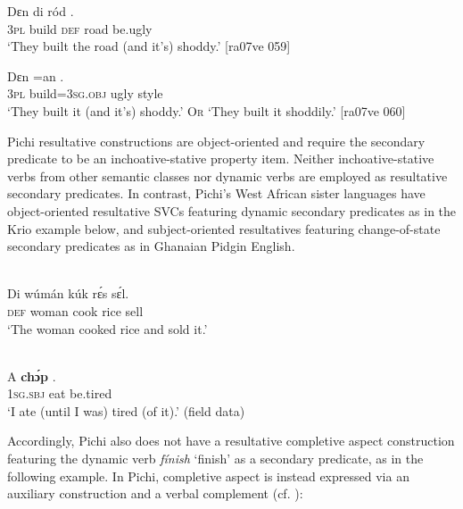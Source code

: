 \ea%
    \label{ex:key:1604}
    \gll Dɛn     di  ród    .\\
\textsc{3pl}  build  \textsc{def}  road    be.ugly\\

\glt ‘They built the road (and it’s) shoddy.’ [ra07ve 059]
\z


\ea%
    \label{ex:key:1605}
    \gll Dɛn  =an      .\\
\textsc{3pl}  build=\textsc{3sg.obj}  ugly    style\\

\glt ‘They built it (and it’s) shoddy.’ \textsc{Or} ‘They built it shoddily.’ [ra07ve 060]
\z

Pichi resultative constructions are object-oriented and require the secondary predicate to be an inchoative-stative property item. Neither inchoative-stative verbs from other semantic classes nor dynamic verbs are employed as resultative secondary predicates. In contrast, Pichi’s West African sister languages have object-oriented resultative SVCs featuring dynamic secondary predicates as in the Krio example below, and subject-oriented resultatives featuring change-of-state secondary predicates as in Ghanaian Pidgin English. 


\ea%
    \label{ex:key:1606}
\\
    \gll Di  wúmán  kúk    rɛ́s    sɛ́l.\\
\textsc{def}  woman  cook  rice    sell\\

\glt ‘The woman cooked rice and sold it.’ \citep[72]{Finney2004}
\z


\ea%
    \label{ex:key:1607}
\\
    \gll A    \textbf{chɔ́p}  .\\
\textsc{1sg.sbj}  eat    be.tired  \\

\glt ‘I ate (until I was) tired (of it).’ (field data)
\z

Accordingly, Pichi also does not have a resultative completive aspect construction featuring the dynamic verb \textit{fínish} ‘finish’ as a secondary predicate, as in the following example. In Pichi, completive aspect is instead expressed via an auxiliary construction and a verbal complement (cf. ):


